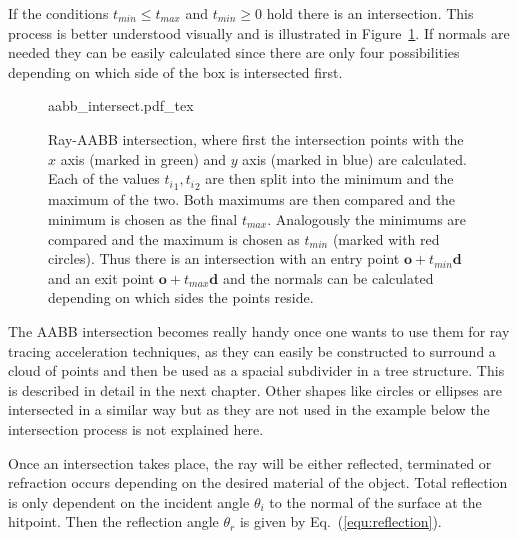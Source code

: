 \documentclass[a4paper,10pt]{article}
\renewcommand{\vec}[1]{\mathbf{#1}}
\newcommand{\equref}[1]{Eq.~(\ref{#1})}
\newcommand{\figref}[1]{Figure~\ref{#1}}
\begin{document}
    If the conditions $t_{min} \leq t_{max}$ and $t_{min} \geq 0$ hold
    there is an intersection.
    This process is better understood visually and is illustrated in 
    \figref{fig:aabb_intersect}.
    If normals are needed they can be easily calculated since there are
    only four possibilities depending on which side of the box is
    intersected first. 

    \begin{center}
        \begin{figure}
            \centering    
            \def\svgwidth{0.6\textwidth}
            {aabb_intersect.pdf_tex}
            \caption{
                Ray-AABB intersection, where first the intersection points with
                the $x$ axis (marked in green) and $y$ axis (marked in blue) are
                calculated.
                Each of the values ${t_i}_1, {t_i}_2$ are then split into the minimum
                and the maximum of the two.
                Both maximums are then compared and the minimum is chosen as the final 
                $t_{max}$.
                Analogously the minimums are compared and the maximum is chosen as
                $t_{min}$ (marked with red circles).
                Thus there is an intersection with an entry point 
                $\vec{o} + t_{min}\vec{d}$ and an exit point 
                $\vec{o} + t_{max}\vec{d}$ and the normals can be calculated depending
                on which sides the points reside.
            }
            \label{fig:aabb_intersect}
        \end{figure}
    \end{center}

    The AABB intersection becomes really handy once one wants to use them
    for ray tracing acceleration techniques, as they can easily be constructed
    to surround a cloud of points and then be used as a spacial subdivider
    in a tree structure.
    This is described in detail in the next chapter.
    Other shapes like circles or ellipses are intersected in a similar way
    but as they are not used in the example below the intersection process
    is not explained here.

    Once an intersection takes place, the ray will be either reflected, terminated
    or refraction occurs depending on the desired material of the object.
    Total reflection is only dependent on the incident angle $\theta_i$ 
    to the normal of the surface at the hitpoint.
    Then the reflection angle $\theta_r$ is given by \equref{equ:reflection}.
\end{document}
